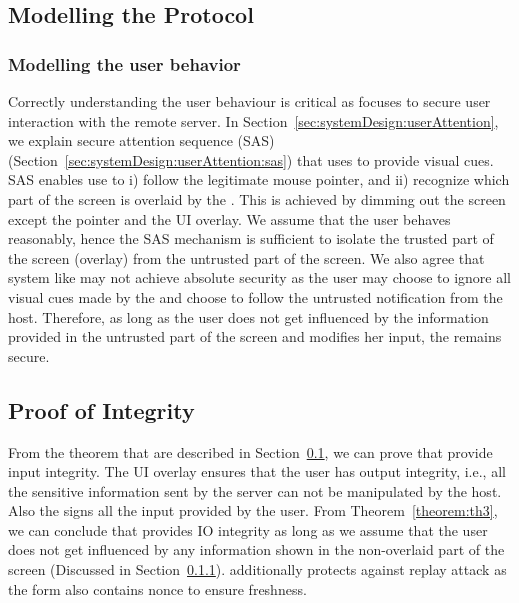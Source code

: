 \subsection{Modelling the Protocol}
\label{sec:securityAnalysis:modelling}

\subsubsection{Modelling the user behavior}
\label{sec:securityAnalysis:modelling:user}

Correctly understanding the user behaviour is critical as \name focuses to secure user interaction with the remote server. In Section~\ref{sec:systemDesign:userAttention}, we explain secure attention sequence (SAS) (Section~\ref{sec:systemDesign:userAttention:sas}) that \name uses to provide visual cues. SAS enables use to i) follow the legitimate mouse pointer, and ii) recognize which part of the screen is overlaid by the \device. This is achieved by dimming out the screen except the pointer and the UI overlay. We assume that the user behaves reasonably, hence the SAS mechanism is sufficient to isolate the trusted part of the screen (\device overlay) from the untrusted part of the screen. We also agree that system like \name may not achieve absolute security as the user may choose to ignore all visual cues made by the \device and choose to follow the untrusted notification from the host. Therefore, as long as the user does not get influenced by the information provided in the untrusted part of the screen and modifies her input, the \name remains secure.


\subsection{Proof of Integrity}
\label{sec:securityAnalysis:integrity}

From the theorem that are described in Section~\ref{sec:securityAnalysis:modelling}, we can prove that \name provide input integrity. The UI overlay ensures that the user has output integrity, i.e., all the sensitive information sent by the server can not be manipulated by the host. Also the \device signs all the input provided by the user. From Theorem~\ref{theorem:th3}, we can conclude that \name provides IO integrity as long as we assume that the user does not get influenced by any information shown in the non-overlaid part of the screen (Discussed in Section~\ref{sec:securityAnalysis:modelling:user}). \name additionally protects against replay attack as the form also contains nonce to ensure freshness.  

